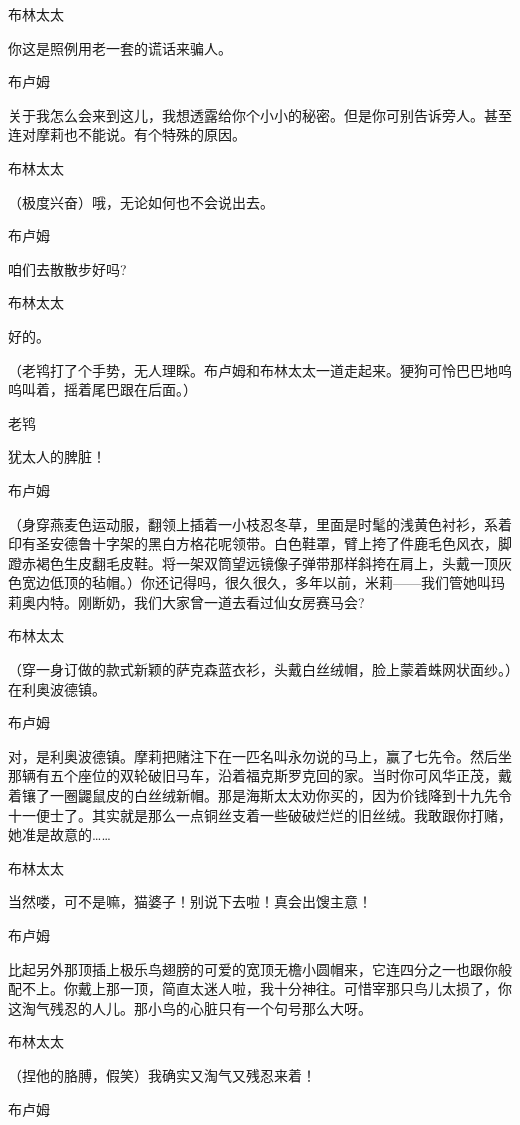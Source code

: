 \par 布林太太
\par 你这是照例用老一套的谎话来骗人。
\par 布卢姆
\par 关于我怎么会来到这儿，我想透露给你个小小的秘密。但是你可别告诉旁人。甚至连对摩莉也不能说。有个特殊的原因。
\par 布林太太
\par （极度兴奋）哦，无论如何也不会说出去。
\par 布卢姆
\par 咱们去散散步好吗?
\par 布林太太
\par 好的。
\par （老鸨打了个手势，无人理睬。布卢姆和布林太太一道走起来。㹴狗可怜巴巴地呜呜叫着，摇着尾巴跟在后面。）
\par 老鸨
\par 犹太人的脾脏！
\par 布卢姆
\par （身穿燕麦色运动服，翻领上插着一小枝忍冬草，里面是时髦的浅黄色衬衫，系着印有圣安德鲁十字架的黑白方格花呢领带。白色鞋罩，臂上挎了件鹿毛色风衣，脚蹬赤褐色生皮翻毛皮鞋。将一架双筒望远镜像子弹带那样斜挎在肩上，头戴一顶灰色宽边低顶的毡帽。）你还记得吗，很久很久，多年以前，米莉——我们管她叫玛莉奥内特。刚断奶，我们大家曾一道去看过仙女房赛马会?
\par 布林太太
\par （穿一身订做的款式新颖的萨克森蓝衣衫，头戴白丝绒帽，脸上蒙着蛛网状面纱。）在利奥波德镇。
\par 布卢姆
\par 对，是利奥波德镇。摩莉把赌注下在一匹名叫永勿说的马上，赢了七先令。然后坐那辆有五个座位的双轮破旧马车，沿着福克斯罗克回的家。当时你可风华正茂，戴着镶了一圈鼹鼠皮的白丝绒新帽。那是海斯太太劝你买的，因为价钱降到十九先令十一便士了。其实就是那么一点铜丝支着一些破破烂烂的旧丝绒。我敢跟你打赌，她准是故意的……
\par 布林太太
\par 当然喽，可不是嘛，猫婆子！别说下去啦！真会出馊主意！
\par 布卢姆
\par 比起另外那顶插上极乐鸟翅膀的可爱的宽顶无檐小圆帽来，它连四分之一也跟你般配不上。你戴上那一顶，简直太迷人啦，我十分神往。可惜宰那只鸟儿太损了，你这淘气残忍的人儿。那小鸟的心脏只有一个句号那么大呀。
\par 布林太太
\par （捏他的胳膊，假笑）我确实又淘气又残忍来着！
\par 布卢姆
